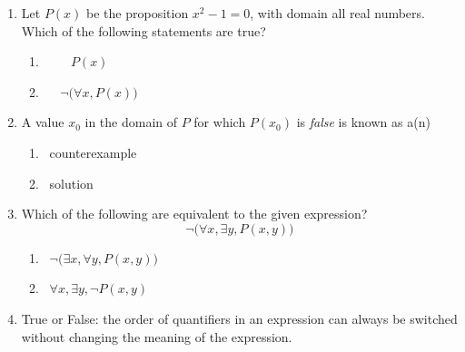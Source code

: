 \pagestyle{empty}


\begin{enumerate}
  \item Let $P(x)$ be the proposition $x^2-1=0$, with domain all real numbers. Which of the following statements are true?
  \begin{enumerate}
    \item {} \   \   \ $P(x)$
    \setcounter{enumii}{4}
    \item {} \  \  $\neg\bigl(\forall x, P(x)\bigr)$
  \end{enumerate}
  
  \item A value $x_0$ in the domain of $P$ for which $P(x_0)$ is \emph{false} is known as a(n) \underline{\phantom{counterexample}\qquad\qquad}
  \begin{enumerate}
    \item {} \ counterexample
    \setcounter{enumii}{2}
    \item {} \ solution
  \end{enumerate}
  
  \item Which of the following are equivalent to the given expression? 
  \[
    \neg\bigl(\forall x, \exists y, P(x,y)\bigr)
  \]
  \begin{enumerate}
    \item {} \ $\neg \bigl(\exists x, \forall y, P(x,y)\bigr)$
    \setcounter{enumii}{2}
    \item {} \ $\forall x, \exists y, \neg P(x,y)$
  \end{enumerate}
  
  \item True or False: the order of quantifiers in an expression can always be switched without changing the meaning of the expression.
\end{enumerate}



